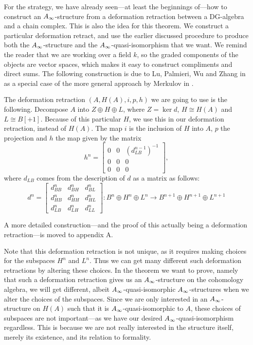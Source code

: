 For the strategy, we have already seen---at least the beginnings of---how to construct an $A_{\infty}$-structure from a deformation retraction between a DG-algebra and a chain complex. This is also the idea for this theorem. We construct a particular deformation retract, and use the earlier discussed procedure to produce both the $A_{\infty}$-structure and the $A_{\infty}$-quasi-isomorphism that we want. We remind the reader that we are working over a field $k$, so the graded components of the objects are vector spaces, which makes it easy to construct compliments and direct sums. The following construction is due to Lu, Palmieri, Wu and Zhang in \cite{Ext} as a special case of the more general approach by Merkulov in \cite{Merkulov}. 

The deformation retraction $(A, H(A), i, p, h)$ we are going to use is the following. Decompose $A$ into $Z\oplus H\oplus L$, where $Z=\ker d$, $H\cong H(A)$ and $L\cong B[+1]$. Because of this particular $H$, we use this in our deformation retraction, instead of $H(A)$. The map $i$ is the inclusion of $H$ into $A$, $p$ the projection and $h$ the map given by the matrix 
\begin{equation*}
h^n = 
\begin{bmatrix}
0 & 0 & (d_{LB}^{n-1})^{-1}\\
0 & 0 & 0\\
0 & 0 & 0
\end{bmatrix}, 
\end{equation*}
where $d_{LB}$ comes from the description of $d$ as a matrix as follows:
\begin{equation*}
d^n = 
\begin{bmatrix}
    d^n_{BB} & d^n_{BH} & d^n_{BL} \\
    d^n_{HB} & d^n_{HH} & d^n_{HL} \\
    d^n_{LB} & d^n_{LH} & d^n_{LL} 
\end{bmatrix}
\colon B^n\oplus H^n\oplus L^n \longrightarrow B^{n+1}\oplus H^{n+1}\oplus L^{n+1}
\end{equation*}

A more detailed construction---and the proof of this actually being a deformation retraction---is moved to appendix A. 

Note that this deformation retraction is not unique, as it requires making choices for the subspaces $H^n$ and $L^n$. Thus we can get many different such deformation retractions by altering these choices. In the theorem we want to prove, namely that such a deformation retraction gives us an $A_{\infty}$-structure on the cohomology algebra, we will get different, albeit $A_{\infty}$-quasi-isomorphic $A_{\infty}$-structures when we alter the choices of the subspaces. Since we are only interested in an $A_{\infty}$-structure on $H(A)$ such that it is $A_{\infty}$-quasi-isomorphic to $A$, these choices of subspaces are not important---as we have our desired $A_{\infty}$-quasi-isomorphism regardless. This is because we are not really interested in the structure itself, merely its existence, and its relation to formality. 

